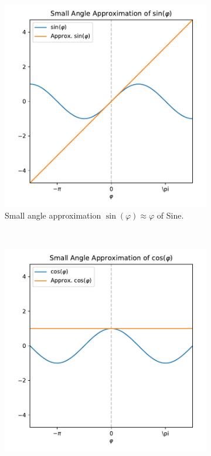 		\begin{figure}
			\centering
			\begin{subfigure}[t]{0.5\linewidth}
				\centering
				\includegraphics[width = \linewidth]{figures/introduction/generated/small-angle-approximation-sin.pdf}
				\caption{Small angle approximation \( \sin(\varphi) \approx \varphi \) of Sine.}
			\end{subfigure}%
			~
			\begin{subfigure}[t]{0.5\linewidth}
				\centering
				\includegraphics[width = \linewidth]{figures/introduction/generated/small-angle-approximation-cos.pdf}

\end{subfigure}
\end{figure}
